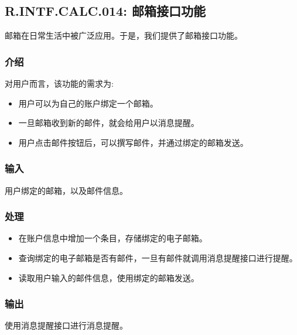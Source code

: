 \subsection{R.INTF.CALC.014: 邮箱接口功能}
邮箱在日常生活中被广泛应用。于是，我们提供了邮箱接口功能。
\subsubsection{介绍}
对用户而言，该功能的需求为:
\begin{itemize}
  \item 用户可以为自己的账户绑定一个邮箱。
  \item 一旦邮箱收到新的邮件，就会给用户以消息提醒。
  \item 用户点击邮件按钮后，可以撰写邮件，并通过绑定的邮箱发送。
\end{itemize}
\subsubsection{输入}
用户绑定的邮箱，以及邮件信息。
\subsubsection{处理}
\begin{itemize}
  \item 在账户信息中增加一个条目，存储绑定的电子邮箱。
  \item 查询绑定的电子邮箱是否有邮件，一旦有邮件就调用消息提醒接口进行提醒。
  \item 读取用户输入的邮件信息，使用绑定的邮箱发送。
\end{itemize}
\subsubsection{输出}
使用消息提醒接口进行消息提醒。